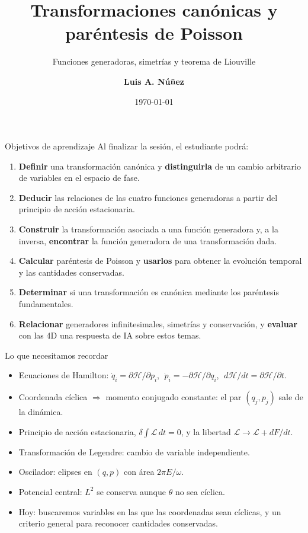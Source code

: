 \documentclass[spanish]{beamer}
\title[Transformaciones canónicas]{\textbf{Transformaciones canónicas y\\ paréntesis de Poisson}}
\subtitle{Funciones generadoras, simetrías y teorema de Liouville}
\author[L.A. Núñez]{\textbf{Luis A. Núñez}}
\institute[UIS]{\textit{Escuela de Física, Facultad de Ciencias,}\\
  \textit{Universidad Industrial de Santander, Santander, Colombia}\\
  \insertarlogo}
\date{\today}
\newcommand{\Lag}{\mathcal{L}}               %
\newcommand{\Ham}{\mathcal{H}}               %
\begin{document}
\begin{frame}
  \titlepage
\end{frame}


\begin{frame}{Objetivos de aprendizaje}
Al finalizar la sesión, el estudiante podrá:
\begin{enumerate}[<+->]
  \item \textbf{Definir} una transformación canónica y \textbf{distinguirla} de un
        cambio arbitrario de variables en el espacio de fase.
  \item \textbf{Deducir} las relaciones de las cuatro funciones generadoras a partir
        del principio de acción estacionaria.
  \item \textbf{Construir} la transformación asociada a una función generadora y,
        a la inversa, \textbf{encontrar} la función generadora de una transformación dada.
  \item \textbf{Calcular} paréntesis de Poisson y \textbf{usarlos} para obtener la
        evolución temporal y las cantidades conservadas.
  \item \textbf{Determinar} si una transformación es canónica mediante los
        paréntesis fundamentales.
  \item \textbf{Relacionar} generadores infinitesimales, simetrías y conservación,
        y \textbf{evaluar} con las 4D una respuesta de IA sobre estos temas.
\end{enumerate}
\end{frame}

\begin{frame}{Lo que necesitamos recordar}
\begin{itemize}[<+->]
  \item Ecuaciones de Hamilton:
        $\dot q_i=\partial\Ham/\partial p_i$, $\;\dot p_i=-\partial\Ham/\partial q_i$,
        $\;d\Ham/dt=\partial\Ham/\partial t$.
  \item Coordenada cíclica $\Rightarrow$ momento conjugado constante: el par
        $(q_j,p_j)$ sale de la dinámica.
  \item Principio de acción estacionaria, $\delta\int\Lag\,dt=0$, y la libertad
        $\Lag\to\Lag+dF/dt$.
  \item Transformación de Legendre: cambio de variable independiente.
  \item Oscilador: elipses en $(q,p)$ con área $2\pi E/\omega$.
  \item Potencial central: $L^2$ se conserva aunque $\theta$ no sea cíclica.
  \item[] \alert{Hoy:} buscaremos variables en las que las coordenadas sean cíclicas,
        y un criterio general para reconocer cantidades conservadas.
\end{itemize}
\end{frame}
\end{document}
